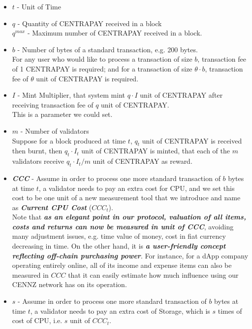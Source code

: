 \documentclass{article}
\begin{document}
\begin{itemize}
  \item $t$ - Unit of Time
  
  \item $q$ - Quantity of CENTRAPAY received in a block\\
  $q^{max}$ - Maximum number of CENTRAPAY received in a block.

  \item $b$ - Number of bytes of a standard transaction, e.g. 200 bytes.\\For any user who would like to process a transaction of size $b$, transaction fee of 1 CENTRAPAY is required; and for a transaction of size $\theta\cdot b$, transaction fee of $\theta$ unit of CENTRAPAY is required.
  
  \item $I$ - Mint Multiplier, that system mint $q\cdot I$ unit of CENTRAPAY after receiving transaction fee of $q$ unit of CENTRAPAY. \\
  This is a parameter we could set.
  
  \item $m$ - Number of validators\\
  Suppose for a block produced at time $t$,  $q_t$ unit of CENTRAPAY is received then burnt, then $q_t\cdot I_t$ unit of CENTRAPAY is minted, that each of the $m$ validators receive $q_t\cdot I_t/m$ unit of CENTRAPAY as reward. 
  
  \item  \textbf{\textit{CCC}} - Assume in order to process one more standard transaction of $b$ bytes at time $t$, a validator needs to pay an extra cost for CPU, and we set this cost to be one unit of a new measurement tool that we introduce and name as \textbf{\textit{Current CPU Cost}} (\textbf{$CCC_t$}). \\
  
  Note that \textbf{\textit{as an elegant point in our protocol, valuation of all items, costs and returns can now be measured in unit of CCC}}, avoiding many adjustment issues, e.g. time value of money, cost in fiat currency decreasing in time. On the other hand, it is \textbf{\textit{a user-friendly concept reflecting off-chain purchasing power}}. For instance, for a dApp company operating entirely online, all of its income and expense items can also be measured in $CCC$ that it can easily estimate how much influence using our CENNZ network has on its operation. 
  
  \item $s$ - Assume in order to process one more standard transaction of $b$ bytes at time $t$, a validator needs to pay an extra cost of Storage, which is $s$ times of cost of CPU, i.e. $s$ unit of $CCC_t$.
    

\end{itemize}
\end{document}
